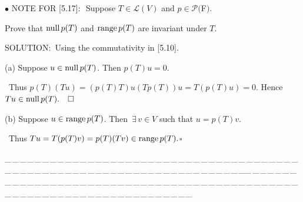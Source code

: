 \documentclass[a4paper, 11pt, UTF8]{article}
\def\range{\textup{range}\,}
\def\null{\textup{null\,}}
\def\Lm{\mathcal{L}}
\def\Po{\mathcal{P}}
\begin{document}
\begin{large}
{\small $\bullet$} {\timesbf\Large N{\normalsize OTE} F{\normalsize OR} [5.17]:} \,\,{\timessl\Large Suppose $T\in\Lm(V)$ and $p\in\Po(${\timesbf F}$)$.}\par\qquad\qquad\qquad\qquad\qquad
{\timessl\Large Prove that $\null p(T)$ and $\range p(T)$ are invariant under $T$.}\par
{\timesbf S\footnotesize{OLUTION:}}\,\,\,Using the commutativity in [5.10].\par\quad
(a) Suppose $u\in\null p(T)$. Then $p(T)u = 0$.\par\qquad\,
Thus $p(T)(Tu) = (p(T) T)u (Tp(T))u=T(p(T)u) = 0$. Hence $Tu\in\null p(T).\quad\square$\par\quad
(b) Suppose $u\in\range p(T)$. Then $\,\exists\,v\in V$ such that $u = p(T)v$.\par\qquad\,
Thus $Tu = T(p(T)v) = p(T)(Tv)\in\range p(T).$\quad$\square$\par
{\tiny \_\,\_\,\_\,\_\,\_\,\_\,\_\,\_\,\_\,\_\,\_\,\_\,\_\,\_\,\_\,\_\,\_\,\_\,\_\,\_\,\_\,\_\,\_\,\_\,\_\,\_\,\_\,\_\,\_\,\_\,\_\,\_\,\_\,\_\,\_\,\_\,\_\,\_\,\_\,\_\,\_\,\_\,\_\,\_\,\_\,\_\,\_\,\_\,\_\,\_\,\_\,\_\,\_\,\_\,\_\,\_\,\_\,\_\,\_\,\_\,\_\,\_\,\_\,\_\,\_\,\_\,\_\,\_\,\_\,\_\,\_\_\,\_\,\_\,\_\,\_\,\_\,\_\,\_\,\_\,\_\,\_\,\_\,\_\,\_\,\_\,\_\,\_\,\_\,\_\,\_\,\_\,\_\,\_\,\_\,\_\,\_\,\_\,\_\,\_\,\_\,\_\,\_\,\_\,\_\,\_\,\_\,\_\,\_\,\_\,\_\,\_\,\_\,\_\,\_\,\_\,\_\,\_\,\_\,\_\,\_\,\_\,\_\,\_\,\_\,\_\,\_\,\_\,\_\,\_\,\_\,\_\,\_\,\_\,\_\,\_\,\_\,\_\,\_\,\_\,\_\,\_}{\small\par}


\end{large}
\end{document}
